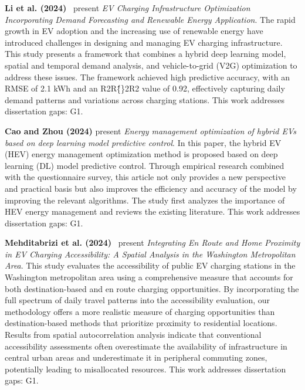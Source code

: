 \documentclass[letterpaper, 12pt, oneside, doublespacing]{Thesis}
\begin{document}
\noindent \textbf{Li et al. (2024)}~\cite{electric_vehicle_2024} present \textit{EV Charging Infrastructure Optimization Incorporating Demand Forecasting and Renewable Energy Application}. The rapid growth in EV adoption and the increasing use of renewable energy have introduced challenges in designing and managing EV charging infrastructure. This study presents a framework that combines a hybrid deep learning model, spatial and temporal demand analysis, and vehicle-to-grid (V2G) optimization to address these issues. The framework achieved high predictive accuracy, with an RMSE of 2.1 kWh and an R2R\^\{\}2R2 value of 0.92, effectively capturing daily demand patterns and variations across charging stations. This work addresses dissertation gaps: G1.



\noindent \textbf{Cao and Zhou (2024)} present \textit{Energy management optimization of hybrid EVs based on deep learning model predictive control}. In this paper, the hybrid EV (HEV) energy management optimization method is proposed based on deep learning (DL) model predictive control. Through empirical research combined with the questionnaire survey, this article not only provides a new perspective and practical basis but also improves the efficiency and accuracy of the model by improving the relevant algorithms. The study first analyzes the importance of HEV energy management and reviews the existing literature. This work addresses dissertation gaps: G1.



\noindent \textbf{Mehditabrizi et al. (2024)}~\cite{integrating_en_2024} present \textit{Integrating En Route and Home Proximity in EV Charging Accessibility: A Spatial Analysis in the Washington Metropolitan Area}. This study evaluates the accessibility of public EV charging stations in the Washington metropolitan area using a comprehensive measure that accounts for both destination-based and en route charging opportunities. By incorporating the full spectrum of daily travel patterns into the accessibility evaluation, our methodology offers a more realistic measure of charging opportunities than destination-based methods that prioritize proximity to residential locations. Results from spatial autocorrelation analysis indicate that conventional accessibility assessments often overestimate the availability of infrastructure in central urban areas and underestimate it in peripheral commuting zones, potentially leading to misallocated resources. This work addresses dissertation gaps: G1.
\end{document}
